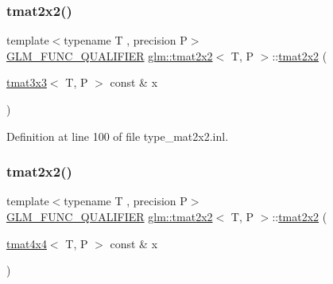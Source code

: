 \mbox{\label{structglm_1_1tmat2x2_a21e814f61b4c8769f9e7ac36e531fc3a}} 
\subsubsection{\texorpdfstring{tmat2x2()}{tmat2x2()}\hspace{0.1cm}{\footnotesize\ttfamily [11/22]}}
{\footnotesize\ttfamily template$<$typename T , precision P$>$ \\
\mbox{\hyperlink{setup_8hpp_a33fdea6f91c5f834105f7415e2a64407}{G\+L\+M\+\_\+\+F\+U\+N\+C\+\_\+\+Q\+U\+A\+L\+I\+F\+I\+ER}} \mbox{\hyperlink{structglm_1_1tmat2x2}{glm\+::tmat2x2}}$<$ T, P $>$\+::\mbox{\hyperlink{structglm_1_1tmat2x2}{tmat2x2}} (\begin{DoxyParamCaption}\item[{\mbox{\hyperlink{structglm_1_1tmat3x3}{tmat3x3}}$<$ T, P $>$ const \&}]{x }\end{DoxyParamCaption})}



Definition at line 100 of file type\+\_\+mat2x2.\+inl.

\mbox{\label{structglm_1_1tmat2x2_a8da598daa30e0df8eba907c63cff1e7a}} 
\subsubsection{\texorpdfstring{tmat2x2()}{tmat2x2()}\hspace{0.1cm}{\footnotesize\ttfamily [12/22]}}
{\footnotesize\ttfamily template$<$typename T , precision P$>$ \\
\mbox{\hyperlink{setup_8hpp_a33fdea6f91c5f834105f7415e2a64407}{G\+L\+M\+\_\+\+F\+U\+N\+C\+\_\+\+Q\+U\+A\+L\+I\+F\+I\+ER}} \mbox{\hyperlink{structglm_1_1tmat2x2}{glm\+::tmat2x2}}$<$ T, P $>$\+::\mbox{\hyperlink{structglm_1_1tmat2x2}{tmat2x2}} (\begin{DoxyParamCaption}\item[{\mbox{\hyperlink{structglm_1_1tmat4x4}{tmat4x4}}$<$ T, P $>$ const \&}]{x }\end{DoxyParamCaption})}



